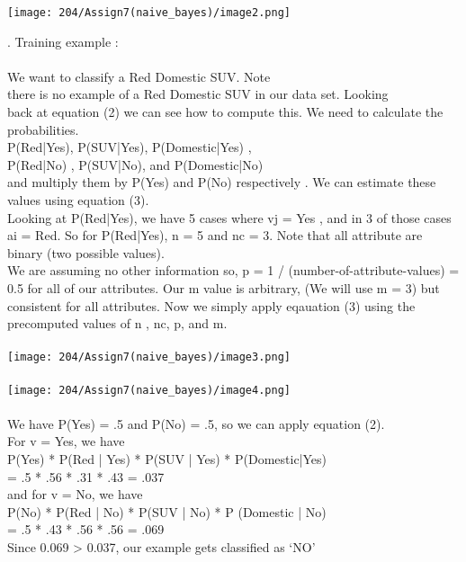 \documentclass[11pt]{article}
\begin{document}
	
	\texttt{[image: 204/Assign7(naive\_bayes)/image2.png]}
	
	. Training example : \\ \\
	We want to classify a Red Domestic SUV. Note \\
	there is no example of a Red Domestic SUV in our data set. Looking \\
	back at equation (2) we can see how to compute this. We need to calculate
	the probabilities. \\
	P(Red|Yes), P(SUV|Yes), P(Domestic|Yes) , \\
	P(Red|No) , P(SUV|No), and P(Domestic|No) \\
	and multiply them by P(Yes) and P(No) respectively . We can estimate these values using
	equation (3). \\
	Looking at P(Red|Yes), we have 5 cases where vj = Yes , and in 3 of those cases ai = Red. So for
	P(Red|Yes), n = 5 and nc = 3. Note that all attribute are binary (two possible values).   \\
	We are
	assuming no other information so, p = 1 / (number-of-attribute-values) = 0.5 for all of our
	attributes. Our m value is arbitrary, (We will use m = 3) but consistent for all attributes. Now we
	simply apply eqauation (3) using the precomputed values of n , nc, p, and m. \\ \\
	
	\texttt{[image: 204/Assign7(naive\_bayes)/image3.png]} \\ \\
	\texttt{[image: 204/Assign7(naive\_bayes)/image4.png]} \\ \\
	
	
	We have P(Yes) = .5 and P(No) = .5, so we can apply equation (2). \\
	For v = Yes, we have \\
	P(Yes) * P(Red | Yes) * P(SUV | Yes) * P(Domestic|Yes) \\
	= .5 * .56 * .31 * .43 = .037 \\
	and for v = No, we have \\
	P(No) * P(Red | No) * P(SUV | No) * P (Domestic | No) \\
	= .5 * .43 * .56 * .56 = .069 \\
	Since 0.069 > 0.037, our example gets classified as ‘NO’ \\
	
\end{document}
